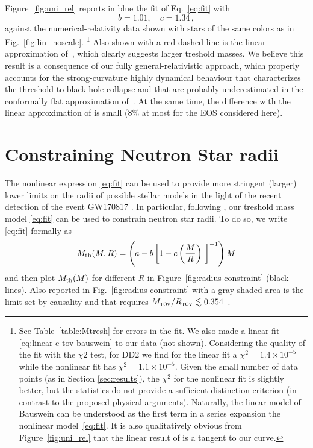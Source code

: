Figure~\ref{fig:uni_rel} reports in blue the fit of Eq.~\eqref{eq:fit}
with
\begin{equation}
b = 1.01, \quad c = 1.34 \,,
\end{equation}
against the numerical-relativity data shown with stars of the same
colors as in Fig.~\ref{fig:lin_noscale}. \footnote{
	See Table~\ref{table:Mtresh} for errors in the fit.
	We also made a linear fit \eqref{eq:linear-c-tov-bauswein}
	to our data (not shown). Considering the quality of the fit with the $\chi{2}$ test,
	\eg for DD2 we find for the linear fit a $\chi^2 = 1.4\times 10^{-5}$
	while the nonlinear fit has $\chi^2 = 1.1\times 10^{-5}$. Given the small
	number of data points (as in Section \ref{sec:results}), the $\chi^2$ for
	the nonlinear fit is slightly better, but the statistics do not provide a
	sufficient distinction criterion (in contrast to the proposed 
	physical arguments).
	Naturally, the linear model of Bauswein can be understood as the first term in
	a series expansion the nonlinear model~\eqref{eq:fit}.
	It is also qualitatively obvious from Figure~\ref{fig:uni_rel} that
	the linear result of \cite{Bauswein2017b} is a tangent to our curve.
} Also shown with a red-dashed
line is the linear approximation of~\cite{Bauswein2017b}, which clearly
suggests larger treshold masses.
We believe this result is a consequence of our fully
general-relativistic approach, which properly accounts for the
strong-curvature highly dynamical behaviour that characterizes the
threshold to black hole collapse and that are probably underestimated in
the conformally flat approximation of~\cite{Bauswein2013}. At the same
time, the difference with the linear approximation of
\cite{Bauswein2017b} is small ($8\%$ at most for the EOS considered here).

\section{Constraining Neutron Star radii}
%
The nonlinear expression \eqref{eq:fit} can be used to provide more stringent
(larger) lower limits on the radii of possible stellar models in the light of
the recent detection of the event GW170817 \cite{Abbott2017}. In particular,
following \cite{Bauswein2017b}, our treshold mass model
\eqref{eq:fit} can be used to constrain neutron star radii. To do so, we write
\eqref{eq:fit} formally as
\begin{equation}\label{eq:rewrite}
M_\textrm{th}(M,R) = \left(a - b \left[1 - c \left( \frac{M}{R} 
\right)~\right]^{-1} \right) M
\end{equation}
and then plot $M_\textrm{th}(M)$ for different $R$ in
Figure~\ref{fig:radius-constraint} (black lines). 
Also reported in
Fig.~\ref{fig:radius-constraint} with a gray-shaded area is the limit set
by causality and that requires $M_{\textsc{tov}}/R_{\textsc{tov}} \lesssim0.354$~\cite{Koranda1997, Lattimer2016}. 

